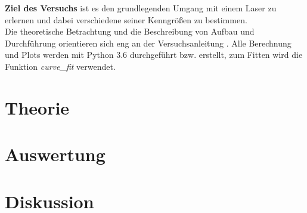 \documentclass[a4,11pt]{article}
\newcommand{\V}{V61}
\begin{document}



\tableofcontents
\clearpage

\textbf{Ziel des Versuchs} ist es den grundlegenden Umgang mit einem Laser zu erlernen und dabei verschiedene seiner Kenngrößen zu bestimmen. \\
Die theoretische Betrachtung und die Beschreibung von Aufbau und Durchführung orientieren sich eng an der Versuchsanleitung \cite{V61}. Alle Berechnung und Plots werden mit Python 3.6 durchgeführt bzw. erstellt, zum Fitten wird die Funktion \textit{curve\_fit} verwendet.

\section{Theorie}

\clearpage



\clearpage


\section{Auswertung}
%
%

\clearpage


\section{Diskussion}


\clearpage
\listoftodos
\listoffigures
\listoftables
\clearpage
\nocite{\V}
\printbibliography[title = Literaturverzeichnis]
\end{document}
